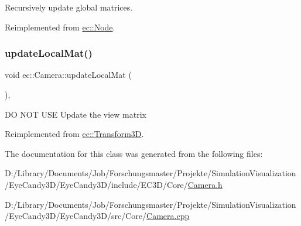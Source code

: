 Recursively update global matrices. 



Reimplemented from \mbox{\hyperlink{classec_1_1_node_a12a9b14ccc434c52404e262ef5db6f80}{ec\+::\+Node}}.

\mbox{\label{classec_1_1_camera_acff95ac4ca039715d67c83111d03b8c1}} 
\subsubsection{\texorpdfstring{update\+Local\+Mat()}{updateLocalMat()}}
{\footnotesize\ttfamily void ec\+::\+Camera\+::update\+Local\+Mat (\begin{DoxyParamCaption}{ }\end{DoxyParamCaption})\hspace{0.3cm}{\ttfamily [override]}, {\ttfamily [virtual]}}

DO N\+OT U\+SE Update the view matrix 

Reimplemented from \mbox{\hyperlink{classec_1_1_transform3_d_a68d259da063ea2aff48720ae55870445}{ec\+::\+Transform3D}}.



The documentation for this class was generated from the following files\+:\begin{DoxyCompactItemize}
\item 
D\+:/\+Library/\+Documents/\+Job/\+Forschungsmaster/\+Projekte/\+Simulation\+Visualization/\+Eye\+Candy3\+D/\+Eye\+Candy3\+D/include/\+E\+C3\+D/\+Core/\mbox{\hyperlink{_camera_8h}{Camera.\+h}}\item 
D\+:/\+Library/\+Documents/\+Job/\+Forschungsmaster/\+Projekte/\+Simulation\+Visualization/\+Eye\+Candy3\+D/\+Eye\+Candy3\+D/src/\+Core/\mbox{\hyperlink{_camera_8cpp}{Camera.\+cpp}}\end{DoxyCompactItemize}
